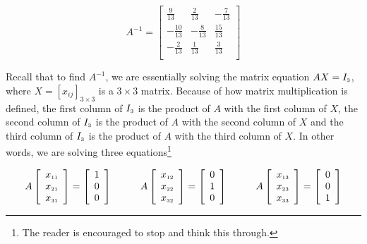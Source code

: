 \documentclass{ximera}
\begin{document}
\[ A^{-1} = \left[ \begin{array}{rrr} \frac{9}{13} & \frac{2}{13} & -\frac{7}{13} \\[3pt] -\frac{10}{13} & -\frac{8}{13} & \frac{15}{13} \\[3pt] -\frac{2}{13} & \frac{1}{13} & \frac{3}{13} \\ \end{array} \right]\]

Recall that to find $A^{-1}$,  we are essentially solving the matrix equation $AX = I_{\mbox{\tiny$3$}}$, where $X = \left[ x_{ij} \right]_{3 \times 3}$ is a $3 \times 3$ matrix.  Because of how matrix multiplication is defined, the first column of $I_{\mbox{\tiny$3$}}$ is the product of $A$ with the first column of $X$, the second column of $I_{\mbox{\tiny$3$}}$ is the product of $A$ with the second column of $X$ and the third column of $I_{\mbox{\tiny$3$}}$ is the product of $A$ with the third column of $X$.  In other words, we are solving three equations\footnote{The reader is encouraged to stop and think this through.}

\[\begin{array}{ccc}

A\left[ \begin{array}{r} x_{\mbox{\tiny$11$}} \\ x_{\mbox{\tiny$21$}} \\ x_{\mbox{\tiny$31$}} \end{array} \right] = \left[ \begin{array}{r} 1 \\ 0 \\ 0 \end{array} \right]

&
\qquad
A\left[ \begin{array}{r} x_{\mbox{\tiny$12$}} \\ x_{\mbox{\tiny$22$}} \\ x_{\mbox{\tiny$32$}} \end{array} \right] = \left[ \begin{array}{r} 0 \\ 1 \\ 0 \end{array} \right] 

& 

\qquad

A\left[ \begin{array}{r} x_{\mbox{\tiny$13$}} \\ x_{\mbox{\tiny$23$}} \\ x_{\mbox{\tiny$33$}} \end{array} \right] = \left[ \begin{array}{r} 0 \\ 0 \\ 1 \end{array} \right] \\

\end{array}\]
\end{document}
